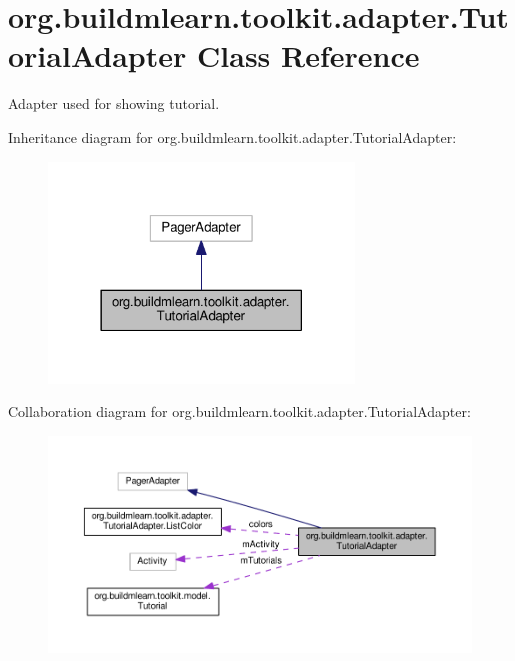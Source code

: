 \hypertarget{classorg_1_1buildmlearn_1_1toolkit_1_1adapter_1_1TutorialAdapter}{}\section{org.\+buildmlearn.\+toolkit.\+adapter.\+Tutorial\+Adapter Class Reference}
\label{classorg_1_1buildmlearn_1_1toolkit_1_1adapter_1_1TutorialAdapter}


Adapter used for showing tutorial.  




Inheritance diagram for org.\+buildmlearn.\+toolkit.\+adapter.\+Tutorial\+Adapter\+:
\nopagebreak
\begin{figure}[H]
\begin{center}
\leavevmode
\includegraphics[width=230pt]{classorg_1_1buildmlearn_1_1toolkit_1_1adapter_1_1TutorialAdapter__inherit__graph}
\end{center}
\end{figure}


Collaboration diagram for org.\+buildmlearn.\+toolkit.\+adapter.\+Tutorial\+Adapter\+:
\nopagebreak
\begin{figure}[H]
\begin{center}
\leavevmode
\includegraphics[width=350pt]{classorg_1_1buildmlearn_1_1toolkit_1_1adapter_1_1TutorialAdapter__coll__graph}
\end{center}
\end{figure}
